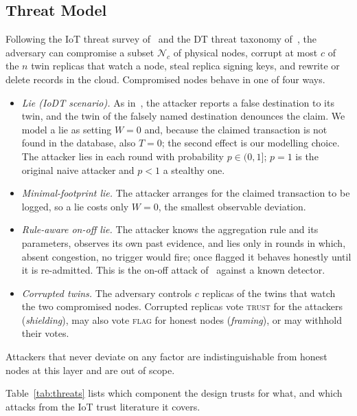 \subsection{Threat Model}
\label{subsec:threat}
Following the IoT threat survey of~\cite{neshenko2019demystifying} and
the DT threat taxonomy of~\cite{alcaraz2022digital}, the adversary can
compromise a subset $\mathcal{N}_c$ of physical nodes, corrupt at most
$c$ of the $n$ twin replicas that watch a node, steal replica signing
keys, and rewrite or delete records in the cloud.  Compromised nodes
behave in one of four ways.
\begin{itemize}
\item \emph{Lie (IoDT scenario).}  As in~\cite{soula2024iodt}, the
attacker reports a false destination to its twin, and the twin of the
falsely named destination denounces the claim.  We model a lie as
setting $W=0$ and, because the claimed transaction is not found in the
database, also $T=0$; the second effect is our modelling choice.  The
attacker lies in each round with probability $p\in(0,1]$; $p=1$ is the
original naive attacker and $p<1$ a stealthy one.
\item \emph{Minimal-footprint lie.}  The attacker arranges for the
claimed transaction to be logged, so a lie costs only $W=0$, the
smallest observable deviation.
\item \emph{Rule-aware on-off lie.}  The attacker knows the
aggregation rule and its parameters, observes its own past evidence,
and lies only in rounds in which, absent congestion, no trigger would
fire; once flagged it behaves honestly until it is re-admitted.  This
is the on-off attack of~\cite{sun2006trust} against a known detector.
\item \emph{Corrupted twins.}  The adversary controls $c$ replicas
of the twins that watch the two compromised nodes.  Corrupted replicas
vote \textsc{trust} for the attackers (\emph{shielding}), may also
vote \textsc{flag} for honest nodes (\emph{framing}), or may withhold
their votes.
\end{itemize}
Attackers that never deviate on any factor are indistinguishable from
honest nodes at this layer and are out of scope.

Table~\ref{tab:threats} lists which component the design trusts for
what, and which attacks from the IoT trust literature it covers.

